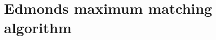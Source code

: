 \documentclass[hyperref={pdfpagelabels=false}]{beamer}
\begin{document}
\section{Edmonds maximum matching algorithm}

%				
%				
%				
\end{document}
